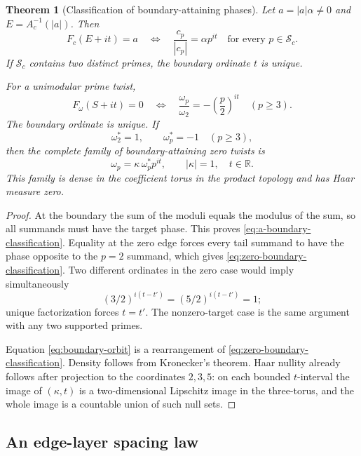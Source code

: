 \documentclass[11pt]{article}
\newtheorem{theorem}{Theorem}[section]
\theoremstyle{definition}
\theoremstyle{remark}
\newcommand{\R}{\mathbb R}
\begin{document}
\begin{theorem}[Classification of boundary-attaining phases]
\label{thm:boundary-attaining-orbits}
Let $a=|a|\alpha\ne0$ and $E=A_c^{-1}(|a|)$.  Then
\begin{equation}
 F_c(E+it)=a
 \quad\Longleftrightarrow\quad
 \frac{c_p}{|c_p|}=\alpha p^{it}
 \quad\text{for every }p\in\mathcal S_c.
 \label{eq:a-boundary-classification}
\end{equation}
If $\mathcal S_c$ contains two distinct primes, the boundary ordinate
$t$ is unique.

For a unimodular prime twist,
\begin{equation}
 F_\omega(S+it)=0
 \quad\Longleftrightarrow\quad
 \frac{\omega_p}{\omega_2}
 =-\left(\frac p2\right)^{it}
 \quad(p\ge3).
 \label{eq:zero-boundary-classification}
\end{equation}
The boundary ordinate is unique.  If
\[
 \omega_2^*=1,
 \qquad \omega_p^*=-1\quad(p\ge3),
\]
then the complete family of boundary-attaining zero twists is
\begin{equation}
 \omega_p=\kappa\,\omega_p^*p^{it},
 \qquad |\kappa|=1,\quad t\in\R.
 \label{eq:boundary-orbit}
\end{equation}
This family is dense in the coefficient torus in the product topology
and has Haar measure zero.
\end{theorem}

\begin{proof}
At the boundary the sum of the moduli equals the modulus of the sum, so
all summands must have the target phase.  This proves
\eqref{eq:a-boundary-classification}.  Equality at the zero edge forces
every tail summand to have the phase opposite to the $p=2$ summand,
which gives \eqref{eq:zero-boundary-classification}.  Two different
ordinates in the zero case would imply simultaneously
\[
 (3/2)^{i(t-t')}=(5/2)^{i(t-t')}=1;
\]
unique factorization forces $t=t'$.  The nonzero-target case is the
same argument with any two supported primes.

Equation \eqref{eq:boundary-orbit} is a rearrangement of
\eqref{eq:zero-boundary-classification}.  Density follows from
Kronecker's theorem.  Haar nullity already follows after projection to
the coordinates $2,3,5$: on each bounded $t$-interval the image of
$(\kappa,t)$ is a two-dimensional Lipschitz image in the three-torus,
and the whole image is a countable union of such null sets.
\end{proof}

\subsection{An edge-layer spacing law}
\end{document}
